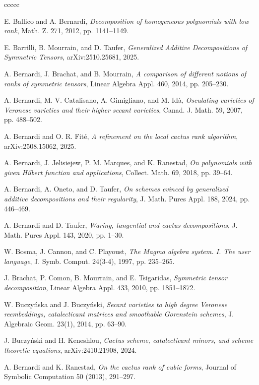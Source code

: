 \documentclass{amsart}
\theoremstyle{plain}
\numberwithin{equation}{section}
\begin{document}
\begin{thebibliography}{ccccc}

 E. Ballico and A. Bernardi,
\emph{Decomposition of homogeneous polynomials with low rank},
Math. Z. 271, 2012, pp. 1141--1149.

 E. Barrilli, B. Mourrain, and D. Taufer,
\emph{Generalized Additive Decompositions of Symmetric Tensors},
arXiv:2510.25681, 2025.

 A. Bernardi, J. Brachat, and B. Mourrain,
\emph{A comparison of different notions of ranks of symmetric tensors},
Linear Algebra Appl. 460, 2014, pp. 205--230.

 A. Bernardi, M. V. Catalisano, A. Gimigliano, and M. Idà,
\emph{Osculating varieties of Veronese varieties and their higher secant varieties},
Canad. J. Math. 59, 2007, pp. 488--502.

 A. Bernardi and O. R. Fité,
\emph{A refinement on the local cactus rank algorithm},
arXiv:2508.15062, 2025.

 A. Bernardi, J. Jelisiejew, P. M. Marques, and K. Ranestad,
\emph{On polynomials with given Hilbert function and applications},
Collect. Math. 69, 2018, pp. 39--64.

 A. Bernardi, A. Oneto, and D. Taufer,
\emph{On schemes evinced by generalized additive decompositions and their regularity},
J. Math. Pures Appl. 188, 2024, pp. 446--469.
    
 A. Bernardi and D. Taufer,
\emph{Waring, tangential and cactus decompositions},
J. Math. Pures Appl. 143, 2020, pp. 1--30.

 W. Bosma, J. Cannon, and C. Playoust,
\emph{The Magma algebra system. I. The user language},
J. Symb. Comput. 24(3-4), 1997, pp. 235--265.

 J. Brachat, P. Comon, B. Mourrain, and E. Tsigaridas, 
\emph{Symmetric tensor decomposition},
Linear Algebra Appl. 433, 2010, pp. 1851--1872.

 W. Buczyńska and J. Buczyński,
\emph{Secant varieties to high degree Veronese reembeddings, catalecticant matrices and smoothable Gorenstein schemes},
J. Algebraic Geom. 23(1), 2014, pp. 63--90.

 J. Buczyński and H. Keneshlou,
\emph{Cactus scheme, catalecticant minors, and scheme theoretic equations},
arXiv:2410.21908, 2024.

 A. Bernardi and K. Ranestad, \emph{On the cactus rank of cubic forms}, Journal of Symbolic
Computation 50 (2013), 291–297.


\end{thebibliography}
\end{document}
